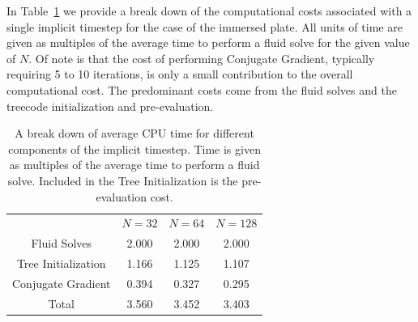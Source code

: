 In Table~\ref{table:ImplictTimeBreakdown} we provide a break down of the computational costs associated with a single implicit timestep for the case of the immersed plate. All units of time are given as multiples of the average time to perform a fluid solve for the given value of $N$. Of note is that the cost of performing Conjugate Gradient, typically requiring 5 to 10 iterations, is only a small contribution to the overall computational cost. The predominant costs come from the fluid solves and the treecode initialization and pre-evaluation.
\begin{table}
\caption{A break down of average CPU time for different components of the implicit timestep. Time is given as multiples of the average time to perform a fluid solve. Included in the Tree Initialization is the pre-evaluation cost.}
\label{table:ImplictTimeBreakdown}
\begin{center}

\begin{tabular}{c c c c}
\rule{0cm}{2.2ex}
& $N=32$ & $N=64$ & $N=128$\\
\cline{2-4}
\rule{0cm}{2.25ex}
Fluid Solves  & 2.000 & 2.000 & 2.000 \\
Tree Initialization & 1.166 & 1.125 & 1.107 \\
Conjugate Gradient            & 0.394 & 0.327 & 0.295 \\
Total         & 3.560 & 3.452 & 3.403 \\
\end{tabular}

\end{center}
\end{table}


